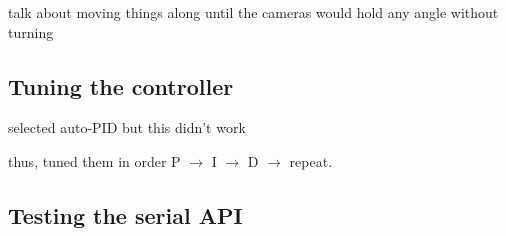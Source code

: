 talk about moving things along until the cameras would hold any angle without turning

\subsection{Tuning the controller}
selected auto-PID but this didn't work

thus, tuned them in order P $\rightarrow$ I $\rightarrow$ D $\rightarrow$ repeat.

\subsection{Testing the serial API}



